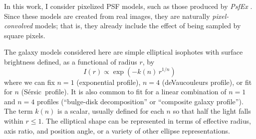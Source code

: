 \documentclass[11pt,preprint]{aastex}
\newcommand{\project}[1]{\textsl{#1}}
\newcommand{\sersic}{S\'ersic}
\begin{document}
In this work, I consider pixelized PSF models, such as those produced
by \project{PsfEx} \citep{psfex}.  Since these models are created from
real images, they are naturally \emph{pixel-convolved} models; that
is, they already include the effect of being sampled by square pixels.

The galaxy models considered here are simple elliptical isophotes with
surface brightness defined, as a functional of radius $r$, by
\begin{equation}
  I(r) \propto \exp(- k(n) \, r^{1/n})
\end{equation}
where we can fix $n=1$ (exponential profile), $n=4$ (deVaucouleurs
profile), or fit for $n$ (\sersic\ profile).  It is also common to fit
for a linear combination of $n=1$ and $n=4$ profiles (``bulge-disk
decomposition'' or ``composite galaxy profile'').  The term $k(n)$ is
a scalar, usually defined for each $n$ so that half the light falls
within $r \le 1$. The elliptical shape can be represented in terms of
effective radius, axis ratio, and position angle, or a variety of
other ellipse representations.
\end{document}
